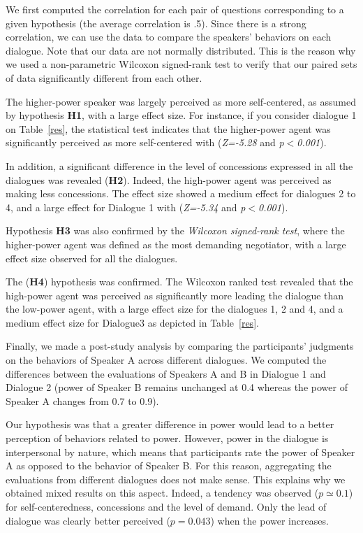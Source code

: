\documentclass{llncs}
\begin{document}
		We first computed the correlation for each pair of questions corresponding to a given hypothesis (the average correlation is .5). Since there is a strong correlation, we can use the data to compare the speakers' behaviors on each dialogue. Note that our data are not normally distributed. This is the reason why we used a non-parametric Wilcoxon signed-rank test to verify that our paired sets of data significantly different from each other.
		
		The higher-power speaker was largely perceived as more self-centered, as assumed by hypothesis \textbf{H1}, with a large effect size. For instance, if you consider dialogue 1 on Table~\ref{res}, the statistical test indicates that the higher-power agent was significantly perceived as more self-centered with (\emph{Z=-5.28} and \emph{p$<$0.001}).
		
		In addition, a significant difference in the level of concessions expressed in all the dialogues was revealed (\textbf{H2}). Indeed, the high-power agent was perceived as making less concessions. The effect size showed a medium effect for dialogues 2 to 4, and a large effect for Dialogue 1 with (\emph{Z=-5.34} and \emph{p$<$0.001}).
		
		Hypothesis \textbf{H3} was also confirmed by the \emph{Wilcoxon signed-rank test}, where the higher-power agent was defined as the most demanding negotiator, with a large effect size observed for all the dialogues. 
		
		The (\textbf{H4}) hypothesis was confirmed. The Wilcoxon ranked test revealed that the high-power agent was perceived as significantly more leading the dialogue than the low-power agent, with a large effect size for the dialogues 1, 2 and 4, and a medium effect size for Dialogue3 as depicted in Table~\ref{res}.
		
		\medskip
		Finally, we made a post-study analysis by comparing the participants' judgments on the behaviors of Speaker A across different dialogues. We computed the differences between the evaluations of Speakers A and B in Dialogue 1 and Dialogue 2 (power of Speaker B remains unchanged at 0.4 whereas the power of Speaker A changes from 0.7 to 0.9).
		
		Our hypothesis was that a greater difference in power would lead to a better perception of behaviors related to power. However, power in the dialogue is interpersonal by nature, which means that participants rate the power of Speaker A as opposed to the behavior of Speaker B. For this reason, aggregating the evaluations from different dialogues does not make sense. This explains why we obtained mixed results on this aspect. Indeed, a tendency was observed ($p\simeq 0.1$) for self-centeredness, concessions and the level of demand. Only the lead of dialogue was clearly better perceived ($p=0. 043$) when the power increases.
		
\end{document}
